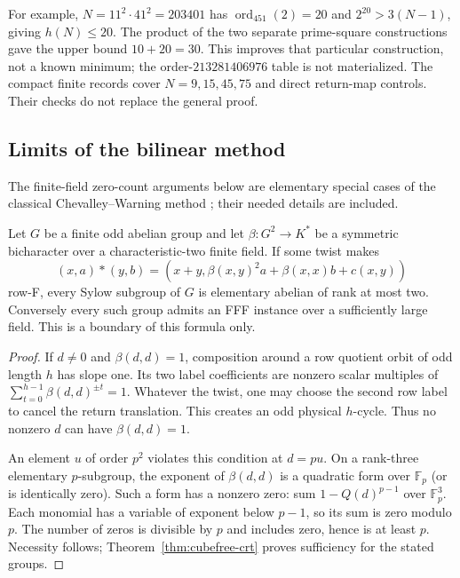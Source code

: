 For example, $N=11^2\cdot41^2=203401$ has
$\operatorname{ord}_{451}(2)=20$ and $2^{20}>3(N-1)$, giving $h(N)\leq20$.
The product of the two separate prime-square constructions gave the
upper bound $10+20=30$. This improves that particular construction,
not a known minimum; the order-$213281406976$ table is not materialized.
The compact finite records cover $N=9,15,45,75$ and direct return-map
controls. Their checks do not replace the general proof.

\subsection{Limits of the bilinear method}

The finite-field zero-count arguments below are elementary special cases
of the classical Chevalley--Warning method
\cite{Chevalley1935,Warning1935}; their needed details are included.

\begin{proposition}
\label{prop:scalar-boundary}
Let $G$ be a finite odd abelian group and let $\beta:G^2\to K^*$ be
a symmetric bicharacter over a characteristic-two finite field. If
some twist makes
\[
 (x,a)*(y,b)=(x+y,\beta(x,y)^2a+\beta(x,x)b+c(x,y))
\]
row-F, every Sylow subgroup of $G$ is elementary abelian of rank at
most two. Conversely every such group admits an FFF instance over a
sufficiently large field. This is a boundary of this formula only.
\end{proposition}

\begin{proof}
If $d\ne0$ and $\beta(d,d)=1$, composition around a row quotient orbit
of odd length $h$ has slope one. Its two label coefficients are nonzero
scalar multiples of $\sum_{t=0}^{h-1}\beta(d,d)^{\pm t}=1$.
Whatever the twist, one may choose the second row label to cancel the
return translation. This creates an odd physical $h$-cycle. Thus no
nonzero $d$ can have $\beta(d,d)=1$.

An element $u$ of order $p^2$ violates this condition at $d=pu$.
On a rank-three elementary $p$-subgroup, the exponent of
$\beta(d,d)$ is a quadratic form over $\mathbb F_p$ (or is identically
zero). Such a form has a nonzero zero: sum $1-Q(d)^{p-1}$ over
$\mathbb F_p^3$. Each monomial has a variable of exponent below
$p-1$, so its sum is zero modulo $p$. The number of zeros is divisible
by $p$ and includes zero, hence is at least $p$. Necessity follows;
Theorem~\ref{thm:cubefree-crt} proves sufficiency for the stated groups.
\end{proof}

